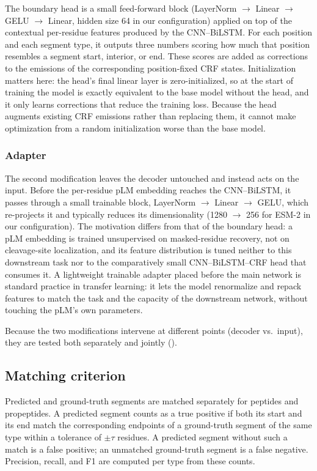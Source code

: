 \documentclass{article}
\begin{document}
The boundary head is a small feed-forward block (LayerNorm $\to$ Linear $\to$ GELU $\to$ Linear, hidden size 64 in our configuration) applied on top of the contextual per-residue features produced by the CNN--BiLSTM. For each position and each segment type, it outputs three numbers scoring how much that position resembles a segment start, interior, or end. These scores are added as corrections to the emissions of the corresponding position-fixed CRF states. Initialization matters here: the head's final linear layer is zero-initialized, so at the start of training the model is exactly equivalent to the base model without the head, and it only learns corrections that reduce the training loss. Because the head augments existing CRF emissions rather than replacing them, it cannot make optimization from a random initialization worse than the base model.

\subsubsection{Adapter}
\label{sec:adapter}

The second modification leaves the decoder untouched and instead acts on the input. Before the per-residue pLM embedding reaches the CNN--BiLSTM, it passes through a small trainable block, LayerNorm $\to$ Linear $\to$ GELU, which re-projects it and typically reduces its dimensionality (1280 $\to$ 256 for ESM-2 in our configuration). The motivation differs from that of the boundary head: a pLM embedding is trained unsupervised on masked-residue recovery, not on cleavage-site localization, and its feature distribution is tuned neither to this downstream task nor to the comparatively small CNN--BiLSTM--CRF head that consumes it. A lightweight trainable adapter placed before the main network is standard practice in transfer learning: it lets the model renormalize and repack features to match the task and the capacity of the downstream network, without touching the pLM's own parameters.

Because the two modifications intervene at different points (decoder vs.\ input), they are tested both separately and jointly ().


\subsection{Matching criterion}
\label{sec:matching}

Predicted and ground-truth segments are matched separately for peptides and propeptides. A predicted segment counts as a true positive if both its start and its end match the corresponding endpoints of a ground-truth segment of the same type within a tolerance of $\pm\tau$ residues. A predicted segment without such a match is a false positive; an unmatched ground-truth segment is a false negative. Precision, recall, and F1 are computed per type from these counts.
\end{document}

